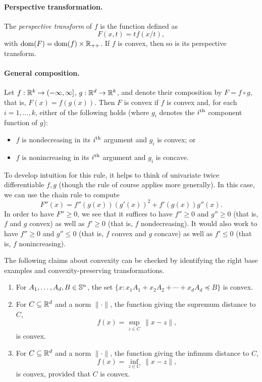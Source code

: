 \paragraph{Perspective transformation.} 

The \emph{perspective transform} of $f$ is the function defined as
\[
F(x,t) = t f(x/t),
\]
with $\operatorname{dom}(F) = \operatorname{dom}(f) \times \mathbb{R}_{++}$. If $f$ is convex, then so is its
perspective transform. 

\paragraph{General composition.} 

Let $f : \mathbb{R}^k \to (-\infty, \infty]$, $g : \mathbb{R}^d \to \mathbb{R}^k$, and denote their
composition by $F = f \circ g$, that is, $F(x) = f(g(x))$. Then $F$ is convex if
$f$ is convex and, for each $i=1,\dots,k$, either of the following holds (where
$g_i$ denotes the $i^{\textnormal{th}}$ component function of $g$): 
\begin{itemize}
\item $f$ is nondecreasing in its $i^{\textnormal{th}}$ argument and $g_i$ is convex; or
\item $f$ is nonincreasing in its $i^{\textnormal{th}}$ argument and $g_i$ is concave.
\end{itemize} 

To develop intuition for this rule, it helps to think of univariate twice
differentiable $f,g$ (though the rule of course applies more generally). In this
case, we can use the chain rule to compute
\[
F''(x) = f''(g(x)) (g'(x))^2 + f'(g(x)) g''(x).
\]
In order to have $F'' \geq 0$, we see that it suffices to have $f'' \geq 0$ and
$g'' \geq 0$ (that is, $f$ and $g$ convex) as well as $f' \geq 0$ (that is, $f$
nondecreasing). It would also work to have $f'' \geq 0$ and $g'' \leq 0$ (that
is, $f$ convex and $g$ concave) as well as $f' \leq 0$ (that is, $f$
nonincreasing).

\medskip

\begin{Example}
The following claims about convexity can be checked by identifying   
the right base examples and convexity-preserving transformations. 

\begin{enumerate}[label=\alph*.]
\item For $A_1,\dots,A_d,B \in \mathbb{S}^n$, the set $\{x : x_1 A_1 + x_2 A_2 +
  \cdots + x_d A_d \preceq B \}$ is convex.  

\item For $C \subseteq \mathbb{R}^d$ and a norm $\|\cdot\|$, the function giving the
  supremum distance to $C$,
\[
f(x) = \sup_{z \in C} \, \|x - z\|,
\]
is convex.

\item For $C \subseteq \mathbb{R}^d$ and a norm $\|\cdot\|$, the function giving the
  infimum distance to $C$,
\[
f(x) = \inf_{z \in C} \, \|x - z\|,
\]
is convex, provided that $C$ is convex.
\end{enumerate}
\end{Example}

